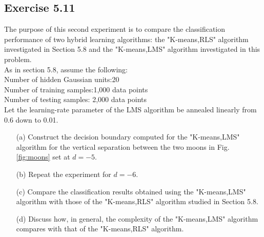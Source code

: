\documentclass[a4paper, 12pt]{article}
\begin{document}
\subsection{Exercise 5.11}
The purpose of this second experiment is to compare the classification performance of two hybrid learning algorithms: the "K-means,RLS" algorithm investigated in Section 5.8 and the "K-means,LMS" algorithm investigated in this problem.\\
	As in section 5.8, assume the following:\\
Number of hidden Gaussian units:20\\
Number of training samples:1,000 data points\\
Number of testing samples: 2,000 data points\\
Let the learning-rate parameter of the LMS algorithm be annealed linearly from 0.6 down to 0.01.
\begin{itemize}
\item[(a)] Construct the decision boundary computed for the "K-means,LMS" algorithm for the vertical separation between the two moons in Fig.\ref{fig:moons} set at $d=-5$.
\item[(b)] Repeat the experiment for $d=-6$.
\item[(c)] Compare the classification results obtained using the "K-means,LMS" algorithm with those of the "K-means,RLS" algorithm studied in Section 5.8.
\item[(d)] Discuss how, in general, the complexity of the "K-means,LMS" algorithm compares with that of the "K-means,RLS" algorithm.
\end{itemize}
\end{document}
